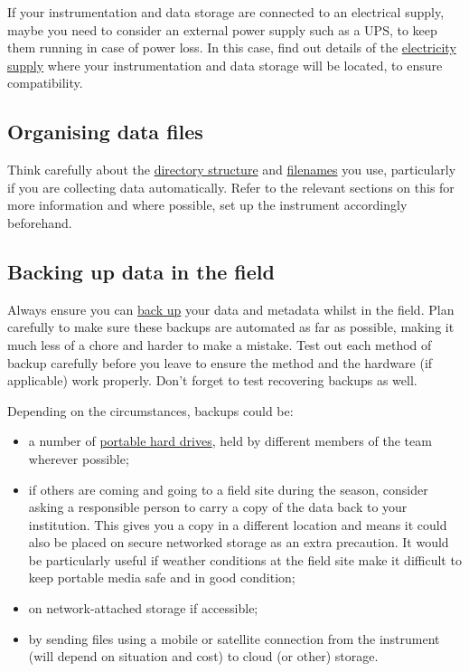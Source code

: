 \documentclass[a4paper,oneside]{report}
\providecommand{\tightlist}{%
  \setlength{\itemsep}{0pt}\setlength{\parskip}{0pt}}
\begin{document}
If your instrumentation and data storage are connected to an electrical
supply, maybe you need to consider an external power supply such as a
UPS, to keep them running in case of power loss. In this case, find out
details of the
\protect\hyperlink{power-and-electricity-supply}{electricity supply}
where your instrumentation and data storage will be located, to ensure
compatibility.

\hypertarget{organising-data-files}{%
\subsection{Organising data files}\label{organising-data-files}}

Think carefully about the
\protect\hyperlink{directory-structure}{directory structure} and
\protect\hyperlink{file-naming}{filenames} you use, particularly if you
are collecting data automatically. Refer to the relevant sections on
this for more information and where possible, set up the instrument
accordingly beforehand.

\hypertarget{backing-up-data-in-the-field}{%
\subsection{Backing up data in the
field}\label{backing-up-data-in-the-field}}

Always ensure you can \protect\hyperlink{backing-up-data}{back up} your
data and metadata whilst in the field. Plan carefully to make sure these
backups are automated as far as possible, making it much less of a chore
and harder to make a mistake. Test out each method of backup carefully
before you leave to ensure the method and the hardware (if applicable)
work properly. Don't forget to test recovering backups as well.

Depending on the circumstances, backups could be:

\begin{itemize}
\tightlist
\item
  a number of \protect\hyperlink{portable-media}{portable hard drives},
  held by different members of the team wherever possible;
\item
  if others are coming and going to a field site during the season,
  consider asking a responsible person to carry a copy of the data back
  to your institution. This gives you a copy in a different location and
  means it could also be placed on secure networked storage as an extra
  precaution. It would be particularly useful if weather conditions at
  the field site make it difficult to keep portable media safe and in
  good condition;
\item
  on network-attached storage if accessible;
\item
  by sending files using a mobile or satellite connection from the
  instrument (will depend on situation and cost) to cloud (or other)
  storage.
\end{itemize}
\end{document}
